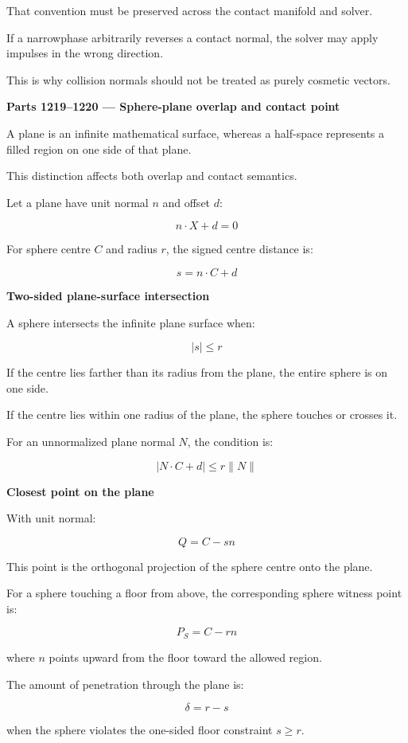 That convention must be preserved across the contact manifold and solver.

If a narrowphase arbitrarily reverses a contact normal, the solver may apply impulses in the wrong direction.

This is why collision normals should not be treated as purely cosmetic vectors.

\textbf{Parts 1219--1220 --- Sphere-plane overlap and contact point}

A plane is an infinite mathematical surface, whereas a half-space represents a filled region on one side of that plane.

This distinction affects both overlap and contact semantics.

Let a plane have unit normal \(n\) and offset \(d\):

\[
n\cdot X+d=0
\]

For sphere centre \(C\) and radius \(r\), the signed centre distance is:

\[
\boxed{ s=n\cdot C+d }
\]

\textbf{Two-sided plane-surface intersection}

A sphere intersects the infinite plane surface when:

\[
\boxed{ |s|\le r }
\]

If the centre lies farther than its radius from the plane, the entire sphere is on one side.

If the centre lies within one radius of the plane, the sphere touches or crosses it.

For an unnormalized plane normal \(N\), the condition is:

\[
\boxed{ |N\cdot C+d|\le r\|N\| }
\]

\textbf{Closest point on the plane}

With unit normal:

\[
\boxed{ Q=C-sn }
\]

This point is the orthogonal projection of the sphere centre onto the plane.

For a sphere touching a floor from above, the corresponding sphere witness point is:

\[
\boxed{ P_S=C-rn }
\]

where \(n\) points upward from the floor toward the allowed region.

The amount of penetration through the plane is:

\[
\boxed{ \delta=r-s }
\]

when the sphere violates the one-sided floor constraint \(s\ge r\).

